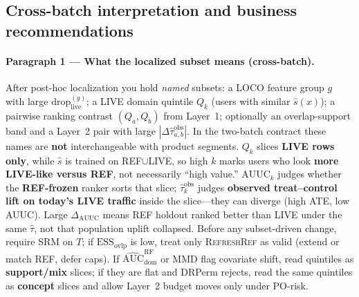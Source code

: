\subsection{Cross-batch interpretation and business recommendations}
\label{sec:cross-batch-business}

\paragraph{Paragraph 1 --- What the localized subset means (cross-batch).}
After post-hoc localization you hold \emph{named} subsets: a LOCO feature group $g$ with large $\mathrm{drop}_{\mathrm{live}}^{(g)}$; a LIVE domain quintile $Q_k$ (users with similar $\hat s(x)$); a pairwise ranking contrast $(Q_a,Q_b)$ from Layer~1; optionally an overlap-support band and a Layer~2 pair with large $|\Delta\widehat{\tau}^{\mathrm{obs}}_{a,b}|$.
In the two-batch contract these names are \textbf{not} interchangeable with product segments.
$Q_k$ slices \textbf{LIVE rows only}, while $\hat s$ is trained on REF$\cup$LIVE, so high $k$ marks users who look \textbf{more LIVE-like versus REF}, not necessarily ``high value.''
$\mathrm{AUUC}_k$ judges whether the \textbf{REF-frozen} ranker sorts that slice; $\widehat{\tau}^{\mathrm{obs}}_k$ judges \textbf{observed treat--control lift on today's LIVE traffic} inside the slice---they can diverge (high ATE, low AUUC).
Large $\Delta_{\mathrm{AUUC}}$ means REF holdout ranked better than LIVE under the same $\hat\tau$, not that population uplift collapsed.
Before any subset-driven change, require SRM on $T$; if $\mathrm{ESS}_{\mathrm{ovlp}}$ is low, treat only \textsc{RefreshRef} as valid (extend or match REF, defer caps).
If $\widehat{\mathrm{AUC}}_{\mathrm{dom}}^{\mathrm{RF}}$ or MMD flag covariate shift, read quintiles as \textbf{support/mix} slices; if they are flat and DRPerm rejects, read the same quintiles as \textbf{concept} slices and allow Layer~2 budget moves only under PO-risk.

